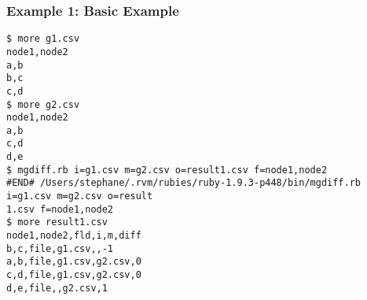 \subsubsection*{Example 1: Basic Example}



\begin{Verbatim}[baselinestretch=0.7,frame=single]
$ more g1.csv
node1,node2
a,b
b,c
c,d
$ more g2.csv
node1,node2
a,b
c,d
d,e
$ mgdiff.rb i=g1.csv m=g2.csv o=result1.csv f=node1,node2
#END# /Users/stephane/.rvm/rubies/ruby-1.9.3-p448/bin/mgdiff.rb i=g1.csv m=g2.csv o=result
1.csv f=node1,node2
$ more result1.csv
node1,node2,fld,i,m,diff
b,c,file,g1.csv,,-1
a,b,file,g1.csv,g2.csv,0
c,d,file,g1.csv,g2.csv,0
d,e,file,,g2.csv,1
\end{Verbatim}
